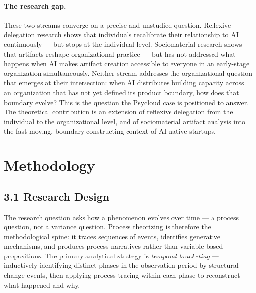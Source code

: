 \documentclass[11pt,a4paper]{article}
\begin{document}
\paragraph{The research gap.} These two streams converge on a precise and unstudied question. Reflexive delegation research shows that individuals recalibrate their relationship to AI continuously --- but stops at the individual level. Sociomaterial research shows that artifacts reshape organizational practice --- but has not addressed what happens when AI makes artifact creation accessible to everyone in an early-stage organization simultaneously. Neither stream addresses the organizational question that emerges at their intersection: when AI distributes building capacity across an organization that has not yet defined its product boundary, how does that boundary evolve? This is the question the Psycloud case is positioned to answer. The theoretical contribution is an extension of reflexive delegation from the individual to the organizational level, and of sociomaterial artifact analysis into the fast-moving, boundary-constructing context of AI-native startups.

\section{Methodology}



\subsection*{3.1 Research Design}

The research question asks how a phenomenon evolves over time --- a process question, not a variance question. Process theorizing \citep{langley1999strategies,langley2013process} is therefore the methodological spine: it traces sequences of events, identifies generative mechanisms, and produces process narratives rather than variable-based propositions. The primary analytical strategy is \emph{temporal bracketing} \citep{langley1999strategies} --- inductively identifying distinct phases in the observation period by structural change events, then applying process tracing \citep{langley2017handbook} within each phase to reconstruct what happened and why.
\end{document}
